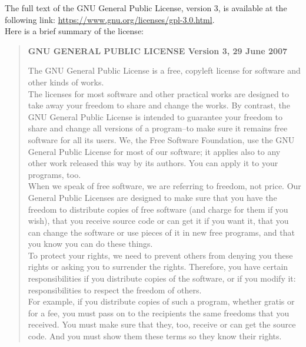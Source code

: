 \documentclass{article}
\begin{document}
    \noindent The full text of the GNU General Public License, version 3, is available at the following link: \url{https://www.gnu.org/licenses/gpl-3.0.html}.\\

    \noindent Here is a brief summary of the license:

    \begin{quote}
        \textbf{GNU GENERAL PUBLIC LICENSE
        Version 3, 29 June 2007}

        The GNU General Public License is a free, copyleft license for software and other kinds of works.\\

        \noindent The licenses for most software and other practical works are designed to take away your freedom to share and change the works.
        By contrast, the GNU General Public License is intended to guarantee your freedom to share and change all versions of a program--to make sure it remains free software for all its users.
        We, the Free Software Foundation, use the GNU General Public License for most of our software; it applies also to any other work released this way by its authors.
        You can apply it to your programs, too.\\

        \noindent When we speak of free software, we are referring to freedom, not price.
        Our General Public Licenses are designed to make sure that you have the freedom to distribute copies of free software (and charge for them if you wish), that you receive source code or can get it if you want it, that you can change the software or use pieces of it in new free programs, and that you know you can do these things.\\

        \noindent To protect your rights, we need to prevent others from denying you these rights or asking you to surrender the rights.
        Therefore, you have certain responsibilities if you distribute copies of the software, or if you modify it: responsibilities to respect the freedom of others.\\

        \noindent For example, if you distribute copies of such a program, whether gratis or for a fee, you must pass on to the recipients the same freedoms that you received.
        You must make sure that they, too, receive or can get the source code.
        And you must show them these terms so they know their rights.
    \end{quote}
\end{document}
